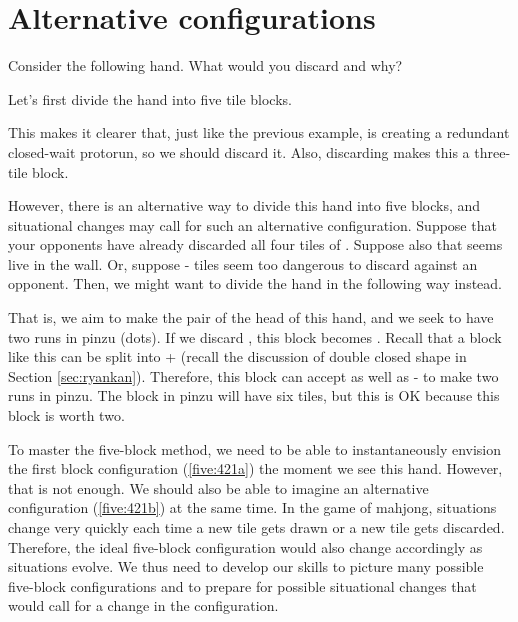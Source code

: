 \section{Alternative configurations}
Consider the following hand. What would you discard and why?

\bp
{}\zhong\zhong\zhong
\ep

Let's first divide the hand into five tile blocks. 

\emj

This makes it clearer that, just like the previous example, {\LARGE{}} is creating a redundant closed-wait protorun, so we should discard it. Also, discarding {\LARGE{}} makes this a three-tile block. 

\bigskip
However, there is an alternative way to divide this hand into five blocks, and situational changes may call for such an alternative configuration. 
Suppose that your opponents have already discarded all four tiles of {\LARGE{}}. Suppose also that {\LARGE{}} seems live in the wall. Or, suppose {\LARGE{}-} tiles seem too dangerous to discard against an opponent. Then, we might want to divide the hand in the following way instead. 

\emj

That is, we aim to make the pair of {\LARGE{}} the head of this hand, and we seek to have two runs in {\jap pinzu} (dots). If we discard {\LARGE{}}, this block becomes {\LARGE{}}. 
Recall that a block like this can be split into {\LARGE{} + } (recall the discussion of double closed shape in Section \ref{sec:ryankan}). Therefore, this block can accept {\LARGE{}} as well as {\LARGE{}-} to make two runs in {\jap pinzu}. The block in {\jap pinzu} will have six tiles, but this is OK because this block is worth two. 

\bigskip
To master the five-block method, we need to be able to instantaneously envision the first block configuration (\ref{five:421a}) the moment we see this hand. However, that is not enough. We should also be able to imagine an alternative configuration (\ref{five:421b}) at the same time. 
In the game of mahjong, situations change very quickly each time a new tile gets drawn or a new tile gets discarded. Therefore, the ideal five-block configuration would also change accordingly as situations evolve. We thus need to develop our skills to picture many possible five-block configurations and to prepare for possible situational changes that would call for a change in the configuration.

